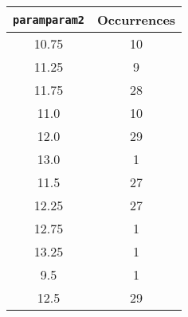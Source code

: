 \documentclass[letterpaper, 12pt]{article}
\begin{document}
\begin{longtable}{|c|c|}
\hline
\textbf{\texttt{paramparam2}} & \textbf{Occurrences} \\
\hline
10.75 & 10 \\
\hline
11.25 & 9 \\
\hline
11.75 & 28 \\
\hline
11.0 & 10 \\
\hline
12.0 & 29 \\
\hline
13.0 & 1 \\
\hline
11.5 & 27 \\
\hline
12.25 & 27 \\
\hline
12.75 & 1 \\
\hline
13.25 & 1 \\
\hline
9.5 & 1 \\
\hline
12.5 & 29 \\
\hline
\end{longtable}
\end{document}
